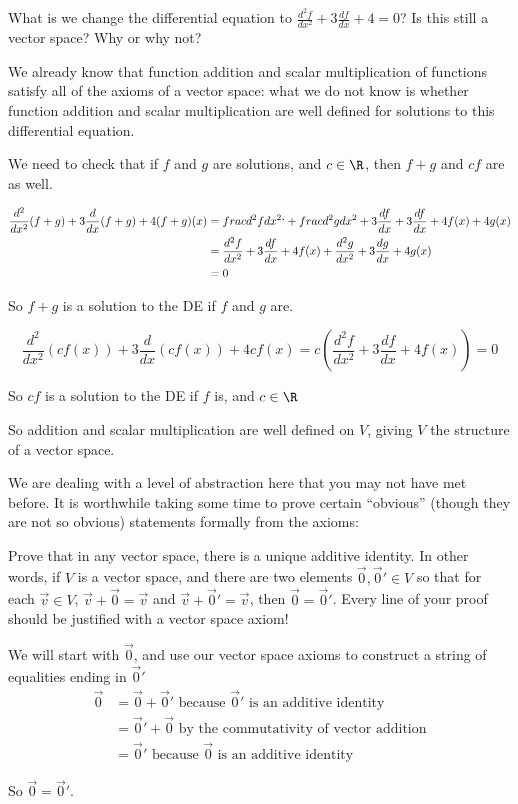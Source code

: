 \documentclass{ximera}
\begin{document}
What is we change the differential equation to $\frac{d^2f}{dx^2} + 3\frac{df}{dx} +4 = 0$?  Is this still a vector space?  Why or why not?
\begin{free-response}
  We already know that function addition and scalar multiplication of functions satisfy all of the axioms of a vector space:  what we do not know is whether
  function addition and scalar multiplication are well defined for solutions to this differential equation.  
			
  We need to check that if $f$ and $g$ are solutions, and $c\in \R$, then $f+g$ and $cf$ are as well.
			
  \begin{align*}
    \frac{d^2}{dx^2}(f+g) + 3\frac{d}{dx}(f+g)+4(f+g)(x) &=  frac{d^2f}{dx^2} `+ frac{d^2g}{dx^2} + 3\frac{df}{dx} + 3\frac{df}{dx} +4f(x)+4g(x)\\
    &= \frac{d^2f}{dx^2} + 3\frac{df}{dx} +4f(x) + \frac{d^2g}{dx^2} + 3\frac{dg}{dx} +4g(x) \\
    &= 0
  \end{align*}
  
  So $f+g$ is a solution to the DE if $f$ and $g$ are.
  
  \[ \frac{d^2}{dx^2} (cf(x))+ 3\frac{d}{dx} (cf(x)) +4cf(x) = c(\frac{d^2f}{dx^2} + 3\frac{df}{dx} +4f(x)) = 0\]
  
  So $cf$ is a solution to the DE if $f$ is, and $c\in \R$
  
  So  addition and scalar multiplication are well defined on $V$, giving $V$ the structure of a vector space.
\end{free-response}

We are dealing with a level of abstraction here that you may not have
met before.  It is worthwhile taking some time to prove certain
``obvious'' (though they are not so obvious) statements
formally from the axioms:
	
Prove that in any vector space, there is a unique additive identity.  In other words, if $V$ is a vector space, and there are two elements $\vec{0},\vec{0}' \in V$ so that for each 
$\vec{v} \in V$, $\vec{v}+\vec{0}=\vec{v}$ and $\vec{v} + \vec{0}' = \vec{v}$, then $\vec{0}=\vec{0}'$.  Every line of your proof should be justified with a vector space axiom!
		
\begin{free-response}
  We will start with $\vec{0}$, and use our vector space axioms to construct a string of equalities ending in $\vec{0}'$
  \begin{align*}
    \vec{0} &= \vec{0}+\vec{0}' \text{ because $\vec{0}'$ is an additive identity}\\
    &= \vec{0}'+\vec{0} \text{ by the commutativity of vector addition}\\
    &=\vec{0}'\text{ because $\vec{0}$ is an additive identity}
  \end{align*}
  
  So $\vec{0} = \vec{0}'$.
\end{free-response}	
		
\end{document}
